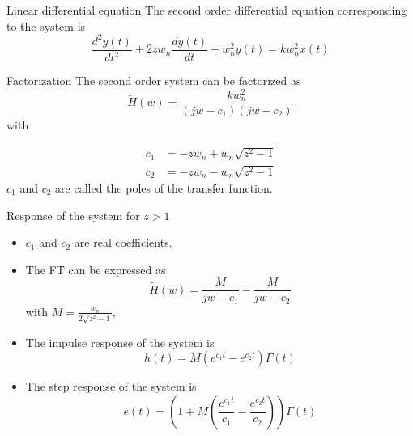   \begin{block}{Linear differential equation}
    The second order differential equation corresponding to the system is
        \begin{equation}
      \label{eq:syst_second_ordre}
      \frac{d^2y(t)}{dt^2}+2zw_n \frac{dy(t)}{dt}+w_n^2y(t)=kw_n^2x(t)
    \end{equation}
      \end{block}
      \begin{block}{Factorization}
    The second order system can be factorized as%
    \begin{equation}
      \label{eq:transfsecondordre3}
      \tilde H(w)=\frac{kw_n^2}{(jw-c_1)(jw-c_2)}
    \end{equation}
    with
    
    \begin{align}
      \label{eq:6}
      c_1&={-zw_n+w_n\sqrt{z^2-1}}\\
      c_2&={-zw_n-w_n\sqrt{z^2-1}}
    \end{align}
     $c_1$ and $c_2$ are called the poles of the transfer function.
      \end{block}


      \begin{block}{Response of the system for  $z>1$}
        \begin{itemize}
        \item 
          $c_1$ and $c_2$ are real coefficients.
        \item The FT can be expressed as
          \begin{equation}
            \label{eq:transfsecondordre5}
            \tilde  H(w)=\frac{M}{jw-c_1}-\frac{M}{jw-c_2}
          \end{equation}
          with $M=\frac{w_n}{2\sqrt{z^2-1}}$,
        \item The impulse response of the system is
          \begin{equation*}
            h(t)=M(e^{c_1t}-e^{c_2t})\Gamma(t)
          \end{equation*}
    
        \item The step response of the system is
          \begin{equation*}
            e(t)=\left(1+M\left(\frac{e^{c_1t}}{c_1}-\frac{e^{c_2t}}{c_2}\right)\right)\Gamma(t)
          \end{equation*}
        \end{itemize}
    
      \end{block}


